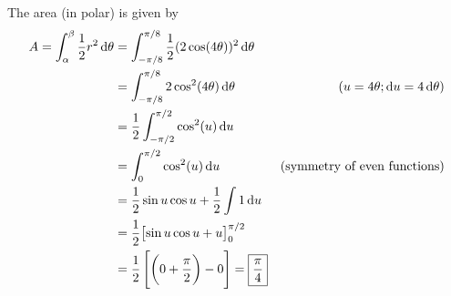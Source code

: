 \documentclass[12pt,answers]{exam}
\begin{document}
\begin{questions}
\begin{solution}
    The area (in polar) is given by
    \begin{align*}
        A = \int_\alpha^\beta \frac12 r^2 \dif \theta
        &= \int_{-\pi/8}^{\pi/8} \frac12 (2\cos(4\theta))^2 \dif \theta\\ 
        &= \int_{-\pi/8}^{\pi/8} 2 \cos^2(4\theta) \dif \theta & (u = 4\theta; \dif u = 4\dif \theta)\\
        &= \frac 12 \int_{-\pi/2}^{\pi/2} \cos^2(u) \dif u \\
        &= \int_{0}^{\pi/2} \cos^2(u) \dif u & (\text{symmetry of even functions})\\
        &= \frac12 \sin u \cos u + \frac 12 \int 1 \dif u \\ 
        &= \frac12 \bigl[\sin u \cos u + u \bigr]_0^{\pi/2} \\
        &= \frac12\left[ \left(0 + \frac\pi2 \right) - 0 \right]
        = \boxed{\frac \pi4}
    \end{align*}
\end{solution}
\end{questions}
\end{document}
